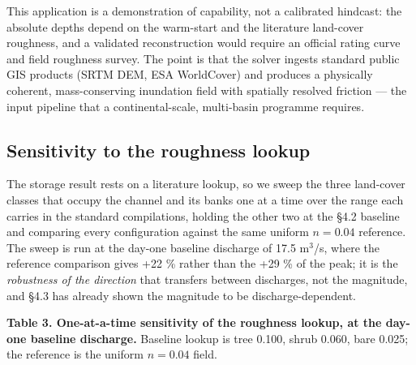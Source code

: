 This application is a demonstration of capability, not a calibrated
hindcast: the absolute depths depend on the warm-start and the
literature land-cover roughness, and a validated reconstruction would
require an official rating curve and field roughness survey. The point
is that the solver ingests standard public GIS products (SRTM DEM, ESA
WorldCover) and produces a physically coherent, mass-conserving
inundation field with spatially resolved friction --- the input pipeline
that a continental-scale, multi-basin programme requires.

\subsection{Sensitivity to the roughness
lookup}

The storage result rests on a literature lookup, so we sweep the three
land-cover classes that occupy the channel and its banks one at a time
over the range each carries in the standard compilations, holding the
other two at the §4.2 baseline and comparing every configuration against
the same uniform \(n = 0.04\) reference. The sweep is run at the day-one
baseline discharge of 17.5 m$^{3}$/s, where the reference comparison gives
+22 \% rather than the +29 \% of the peak; it is the \emph{robustness of
the direction} that transfers between discharges, not the magnitude, and
§4.3 has already shown the magnitude to be discharge-dependent.

\textbf{Table 3. One-at-a-time sensitivity of the roughness lookup, at
the day-one baseline discharge.} Baseline lookup is tree 0.100, shrub
0.060, bare 0.025; the reference is the uniform \(n = 0.04\) field.

